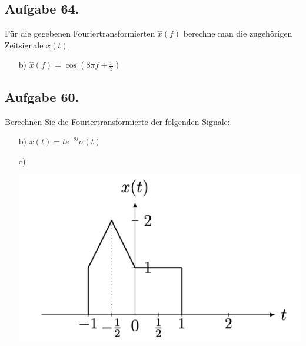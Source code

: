 \documentclass[11pt]{article}
\begin{document}

\subsection*{Aufgabe 64.}
Für die gegebenen Fouriertransformierten $\hat{x}(f)$ berechne man die zugehörigen Zeitsignale $x(t)$.
\vspace*{-0.5cm}
\begin{itemize}
    \item[b)] $\hat{x}(f) = \cos(8 \pi f + \frac{\pi}{3})$
\end{itemize}


\pagebreak

\subsection*{Aufgabe 60.}
\vspace*{-0.5cm}
Berechnen Sie die Fouriertransformierte der folgenden Signale:
\vspace*{-0.5cm}
\begin{itemize}
    \item[b)] $x(t)= te^{-2t} \sigma(t)$
    \item[c)] 
    \item[] \vspace*{-0.5cm}\includegraphics[width=0.4\linewidth]{docimgs/Aufgabe60.png}
\end{itemize}

\end{document}
